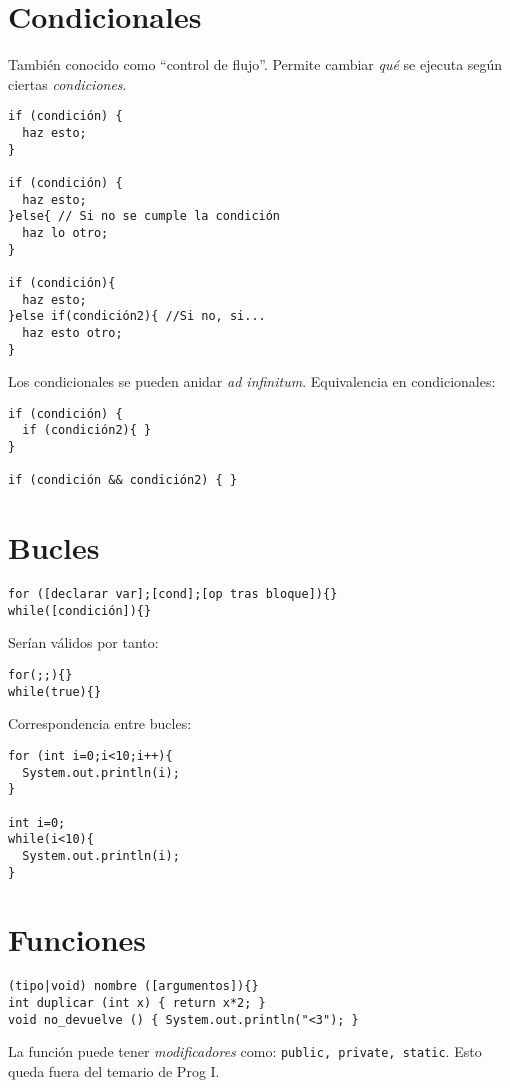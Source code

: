 \documentclass[10pt,twocolumn]{article}
\begin{document}
\section{Condicionales}
\label{sec:condicionales}

También conocido como ``control de flujo''. Permite cambiar \emph{qué} se ejecuta según ciertas \emph{condiciones}.

\begin{verbatim}
if (condición) {
  haz esto;
}

if (condición) {
  haz esto;
}else{ // Si no se cumple la condición
  haz lo otro;
}

if (condición){
  haz esto;
}else if(condición2){ //Si no, si...
  haz esto otro;
}
\end{verbatim}
Los condicionales se pueden anidar \emph{ad infinitum}.
Equivalencia en condicionales:

\begin{verbatim}
if (condición) {
  if (condición2){ }
}

if (condición && condición2) { }
\end{verbatim}

\section{Bucles}
\label{sec:bucles}

\begin{verbatim}
for ([declarar var];[cond];[op tras bloque]){}
while([condición]){}
\end{verbatim}

Serían válidos por tanto:

\begin{verbatim}
for(;;){}
while(true){}
\end{verbatim}

Correspondencia entre bucles:
\begin{verbatim}
for (int i=0;i<10;i++){
  System.out.println(i);
}

int i=0;
while(i<10){
  System.out.println(i);
}
\end{verbatim}

\section{Funciones}
\label{sec:funciones}

\begin{verbatim}
(tipo|void) nombre ([argumentos]){}
int duplicar (int x) { return x*2; }
void no_devuelve () { System.out.println("<3"); }
\end{verbatim}
La función puede tener \emph{modificadores} como: \texttt{public, private, static}. Esto queda fuera del temario de Prog I.
\end{document}
